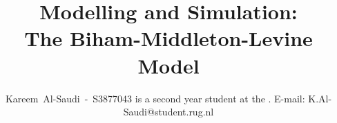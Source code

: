 \title{Modelling and Simulation: \\ The Biham-Middleton-Levine Model}

\author{Kareem~Al-Saudi~-~S3877043%
        \IEEEcompsocitemizethanks
        {
                \IEEEcompsocthanksitem \myName is a second year \myDegree student at the \myUni. E-mail: K.Al-Saudi@student.rug.nl
        }
}